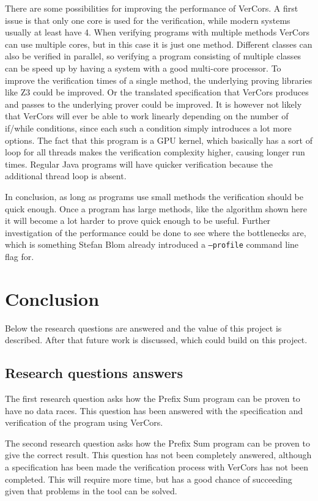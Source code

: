 \documentclass[a4paper]{article}
\newcommand{\code}[1]{\texttt{\small \color{inline}#1}} %
\begin{document}
There are some possibilities for improving the performance of VerCors. A first issue is that only one core is used for the verification, while modern systems usually at least have 4. When verifying programs with multiple methods VerCors can use multiple cores, but in this case it is just one method. Different classes can also be verified in parallel, so verifying a program consisting of multiple classes can be speed up by having a system with a good multi-core processor. To improve the verification times of a single method, the underlying proving libraries like Z3 could be improved. Or the translated specification that VerCors produces and passes to the underlying prover could be improved. It is however not likely that VerCors will ever be able to work linearly depending on the number of if/while conditions, since each such a condition simply introduces a lot more options. The fact that this program is a GPU kernel, which basically has a sort of loop for all threads makes the verification complexity higher, causing longer run times. Regular Java programs will have quicker verification because the additional thread loop is absent.

In conclusion, as long as programs use small methods the verification should be quick enough. Once a program has large methods, like the algorithm shown here it will become a lot harder to prove quick enough to be useful. Further investigation of the performance could be done to see where the bottlenecks are, which is something Stefan Blom already introduced a \code{--profile} command line flag for.

\section{Conclusion}\label{chapter:conclusion}
Below the research questions are answered and the value of this project is described. After that future work is discussed, which could build on this project.

\subsection{Research questions answers}
The first research question asks how the Prefix Sum program can be proven to have no data races. This question has been answered with the specification and verification of the program using VerCors.

The second research question asks how the Prefix Sum program can be proven to give the correct result. This question has not been completely answered, although a specification has been made the verification process with VerCors has not been completed. This will require more time, but has a good chance of succeeding given that problems in the tool can be solved.
\end{document}
